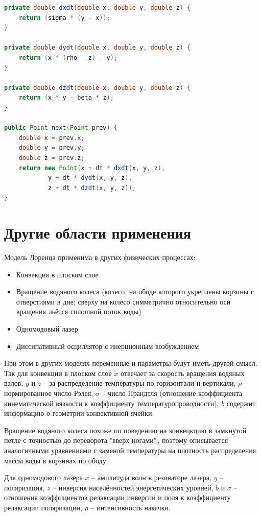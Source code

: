 \documentclass[12pt]{article}
\begin{document}
\begin{lstlisting}[language=Java]
private double dxdt(double x, double y, double z) {
	return (sigma * (y - x));
}

private double dydt(double x, double y, double z) {
	return (x * (rho - z) - y);
}

private double dzdt(double x, double y, double z) {
    return (x * y - beta * z);
}

public Point next(Point prev) {
    double x = prev.x;
    double y = prev.y;
    double z = prev.z;
    return new Point(x + dt * dxdt(x, y, z),
            y + dt * dydt(x, y, z),
            z + dt * dzdt(x, y, z));
}
\end{lstlisting}

\section{Другие области применения}

Модель Лоренца применима в других физических процессах:
\begin{itemize}
	\item Конвекция в плоском слое
	\item Вращение водяного колеса (колесо, на ободе которого укреплены корзины с отверстиями в дне; сверху на колесо симметрично относительно оси вращения льётся сплошной поток воды)
	\item Одномодовый лазер
	\item Диссипативный осциллятор с инерционным возбуждением
\end{itemize}

При этом в других моделях переменные и параметры будут иметь другой смысл. Так для конвекции в плоском слое $x$ отвечает за скорость вращения водяных валов, $y$ и $z$ -- за распределение температуры по горизонтали и вертикали, $\rho$ -- нормированное число Рэлея, $\sigma$ -- число Прандтля (отношение коэффициента кинематической вязкости к коэффициенту температуропроводности), $b$ содержит информацию о геометрии конвективной ячейки. 

Вращение водяного колеса похоже по поведению на конвецкцию в замкнутой петле с точностью до переворота "вверх ногами"\,, поэтому описывается аналогичными уравнениями с заменой температуры на плотность распределения массы воды в корзинах по ободу.

Для одномодового лазера $x$ -- амплитуда волн в резонаторе лазера, $y$ -- поляризация, $z$ -- инверсия населённостей энергетических уровней, $b$ и $\sigma$ -- отношения коэффициентов релаксации инверсии и поля к коэффициенту релаксации поляризации, $\rho$ -- интенсивность накачки.
\end{document}
